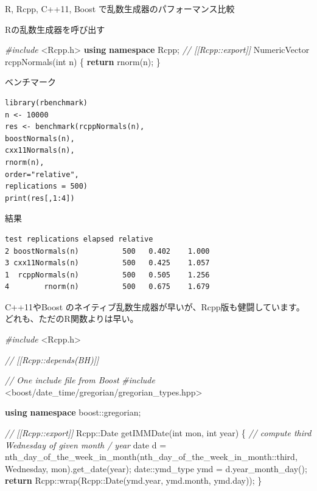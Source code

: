 \documentclass[]{book}
\newenvironment{Shaded}{\begin{snugshade}}{\end{snugshade}}
\newcommand{\CommentTok}[1]{\textcolor[rgb]{0.56,0.35,0.01}{\textit{#1}}}
\newcommand{\ControlFlowTok}[1]{\textcolor[rgb]{0.13,0.29,0.53}{\textbf{#1}}}
\newcommand{\DataTypeTok}[1]{\textcolor[rgb]{0.13,0.29,0.53}{#1}}
\newcommand{\ExtensionTok}[1]{#1}
\newcommand{\ImportTok}[1]{#1}
\newcommand{\KeywordTok}[1]{\textcolor[rgb]{0.13,0.29,0.53}{\textbf{#1}}}
\newcommand{\NormalTok}[1]{#1}
\newcommand{\PreprocessorTok}[1]{\textcolor[rgb]{0.56,0.35,0.01}{\textit{#1}}}
\begin{document}
R, Rcpp, C++11, Boost で乱数生成器のパフォーマンス比較

Rの乱数生成器を呼び出す

\begin{Shaded}
\begin{Highlighting}[]
\PreprocessorTok{#include }\ImportTok{<Rcpp.h>}
\KeywordTok{using} \KeywordTok{namespace}\NormalTok{ Rcpp;}
\CommentTok{// [[Rcpp::export]]}
\NormalTok{NumericVector rcppNormals(}\DataTypeTok{int}\NormalTok{ n) \{}
\ControlFlowTok{return}\NormalTok{ rnorm(n);}
\NormalTok{\}}
\end{Highlighting}
\end{Shaded}

ベンチマーク

\begin{verbatim}
library(rbenchmark)
n <- 10000
res <- benchmark(rcppNormals(n),
boostNormals(n),
cxx11Normals(n),
rnorm(n),
order="relative",
replications = 500)
print(res[,1:4])
\end{verbatim}

結果

\begin{verbatim}
test replications elapsed relative
2 boostNormals(n)          500   0.402    1.000
3 cxx11Normals(n)          500   0.425    1.057
1  rcppNormals(n)          500   0.505    1.256
4        rnorm(n)          500   0.675    1.679
\end{verbatim}

C++11やBoost のネイティブ乱数生成器が早いが、Rcpp版も健闘しています。どれも、ただのR関数よりは早い。

\begin{Shaded}
\begin{Highlighting}[]
\PreprocessorTok{#include }\ImportTok{<Rcpp.h>}

\CommentTok{// [[Rcpp::depends(BH)]]}

\CommentTok{// One include file from Boost}
\PreprocessorTok{#include }\ImportTok{<boost/date_time/gregorian/gregorian_types.hpp>}

\KeywordTok{using} \KeywordTok{namespace} \ExtensionTok{boost::}\NormalTok{gregorian;}

\CommentTok{// [[Rcpp::export]]}
\NormalTok{Rcpp::Date getIMMDate(}\DataTypeTok{int}\NormalTok{ mon, }\DataTypeTok{int}\NormalTok{ year) \{}
\CommentTok{// compute third Wednesday of given month / year}
\NormalTok{date d = nth_day_of_the_week_in_month(nth_day_of_the_week_in_month::third,}
\NormalTok{Wednesday, mon).get_date(year);}
\NormalTok{date::}\DataTypeTok{ymd_type}\NormalTok{ ymd = d.year_month_day();}
\ControlFlowTok{return}\NormalTok{ Rcpp::wrap(Rcpp::Date(ymd.year, ymd.month, ymd.day));}
\NormalTok{\}}
\end{Highlighting}
\end{Shaded}
\end{document}
